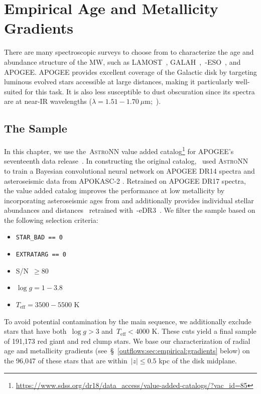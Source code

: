 
\section{Empirical Age and Metallicity Gradients}
\label{outflows:sec:empirical}

There are many spectroscopic surveys to choose from to characterize the age and
abundance structure of the MW, such as LAMOST~\citep{Luo2015},
GALAH~\citep{DeSilva2015, Martell2017},~\gaia-ESO~\citep{Gilmore2012}, and
APOGEE\space\citep{Majewski2017}.
APOGEE provides excellent coverage of the Galactic disk by targeting luminous
evolved stars accessible at large distances, making it particularly well-suited
for this task.
It is also less susceptible to dust obscuration since its spectra are at
near-IR wavelengths ($\lambda = 1.51 - 1.70~\mu$m;~\citealt{Wilson2019}).

\subsection{The Sample}
\label{outflows:sec:empirical:sample}
In this chapter, we use the~\textsc{AstroNN} value added catalog\footnote{
	\url{https://www.sdss.org/dr18/data_access/value-added-catalogs/?vac_id=85}
} for APOGEE's seventeenth data release~\citep[DR17;][]{Abdurrouf2022}.
In constructing the original catalog,~\citet{Mackereth2019b} used
\textsc{AstroNN}~\citep{Leung2019a} to train a Bayesian convolutional neural
network on APOGEE DR14 spectra and asteroseismic data from APOKASC-2
\citep{Pinsonneault2018}.
Retrained on APOGEE DR17 spectra, the value added catalog improves the
performance at low metallicity by incorporating asteroseismic ages from
\citet{Montalban2021} and additionally provides individual stellar abundances
\citep{Leung2019a} and distances~\citep{Leung2019b} retrained
with~\gaia-eDR3~\citep{GaiaCollaboration2021}.
We filter the sample based on the following selection criteria:
\begin{itemize}

	\item \texttt{STAR\_BAD == 0}

	\item \texttt{EXTRATARG == 0}

	\item S/N~$\geq 80$

	\item $\log g = 1 - 3.8$

	\item $T_\text{eff} = 3500 - 5500$ K

\end{itemize}
To avoid potential contamination by the main sequence, we additionally exclude
stars that have both~$\log g > 3$ and~$T_\text{eff} < 4000$ K.
These cuts yield a final sample of 191,173 red giant and red clump stars.
We base our characterization of radial age and metallicity gradients
(see~\S~\ref{outflows:sec:empirical:gradients} below) on the 96,047 of these
stars that are within~$\left|z\right| \leq 0.5$ kpc of the disk midplane.

